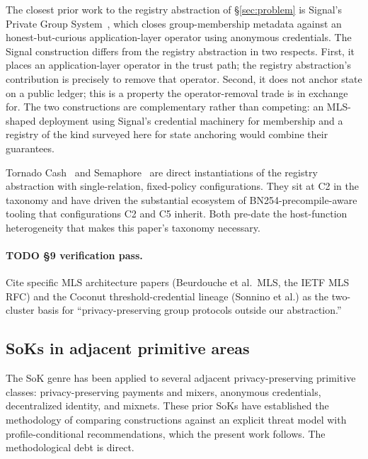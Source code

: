 The closest prior work to the registry abstraction of
\S\ref{sec:problem} is Signal's Private Group
System~\cite{chase-2020-signal-pgs}, which closes group-membership
metadata against an honest-but-curious application-layer operator
using anonymous credentials. The Signal construction differs from
the registry abstraction in two respects. First, it places an
application-layer operator in the trust path; the registry
abstraction's contribution is precisely to remove that operator.
Second, it does not anchor state on a public ledger; this is a
property the operator-removal trade is in exchange for. The two
constructions are complementary rather than competing: an MLS-shaped
deployment using Signal's credential machinery for membership and
a registry of the kind surveyed here for state anchoring would
combine their guarantees.

Tornado Cash~\cite{pertsev-2019-tornado} and
Semaphore~\cite{semaphore-2024} are direct instantiations of the
registry abstraction with single-relation, fixed-policy
configurations. They sit at C2 in the taxonomy and have driven the
substantial ecosystem of BN254-precompile-aware tooling that
configurations C2 and C5 inherit. Both pre-date the host-function
heterogeneity that makes this paper's taxonomy necessary.

\paragraph{TODO §9 verification pass.} Cite specific MLS architecture
papers (Beurdouche et al.\ MLS, the IETF MLS RFC) and the Coconut
threshold-credential lineage (Sonnino et al.) as the two-cluster
basis for ``privacy-preserving group protocols outside our
abstraction.''

\subsection{SoKs in adjacent primitive areas}

The SoK genre has been applied to several adjacent privacy-preserving
primitive classes: privacy-preserving payments and mixers,
anonymous credentials, decentralized identity, and mixnets. These
prior SoKs have established the methodology of comparing
constructions against an explicit threat model with profile-conditional
recommendations, which the present work follows. The methodological
debt is direct.

